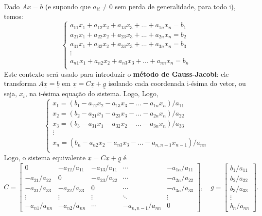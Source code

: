 \documentclass[../numerical_methods.tex]{subfiles}
\begin{document}
Dado \(Ax = b\) (e supondo que \(a_{ii}\neq 0\) sem perda de generalidade, para todo i), temos:
\[
	\left\{\begin{array}{ll}
		a_{11}x_1 + a_{12}x_2 + a_{13}x_3 + \dotsc + a_{1n}x_{n} = b_1 \\
		a_{21}x_1 + a_{22}x_2 + a_{23}x_3 + \dotsc + a_{2n}x_{n} = b_2 \\
		a_{31}x_1 + a_{32}x_2 + a_{33}x_3 + \dotsc + a_{3n}x_{n} = b_3 \\
		\vdots                                                         \\
		a_{n1}x_1 + a_{n2}x_2 + a_{n3}x_3 + \dotsc + a_{nn}x_{n} = b_n \\
	\end{array}\right.
\]
Este contexto será usado para introduzir o \textbf{método de Gauss-Jacobi}: ele transforma \(A\underline{x} = \underline{b}\) em \(\underline{x} = C\underline{x} + \underline{g}\) isolando cada coordenada i-ésima do vetor, ou seja, \(x_{i}\), na i-ésima equação do sistema. Logo,
Logo,
\[
	\left\{\begin{array}{ll}
		x_1 = (b_1-a_{12}x_2 - a_{13}x_3 -\dotsc - a_{1n}x_{n})/a_{11}       \\
		x_2 = (b_2-a_{21}x_1 - a_{23}x_3 -\dotsc - a_{2n}x_{n})/a_{22}       \\
		x_3 = (b_3-a_{31}x_1 - a_{32}x_2 -\dotsc - a_{3n}x_{n})/a_{33}       \\
		\vdots                                                               \\
		x_n = (b_n-a_{n2}x_2 - a_{n3}x_3 -\dotsc - a_{n, n-1}x_{n-1})/a_{nn} \\
	\end{array}\right.
\]
Logo, o sistema equivalente \(\underline{x} = C\underline{x} + \underline{g}\) é
\[
	C = \begin{bmatrix}
		0              & -a_{12}/a_{11} & -a_{13}/a_{11} & \cdots            & -a_{1n}/a_{11} \\
		-a_{21}/a_{22} & 0              & -a_{23}/a_{22} & \cdots            & -a_{2n}/a_{22} \\
		-a_{31}/a_{33} & -a_{32}/a_{33} & 0              & \cdots            & -a_{3n}/a_{33} \\
		\vdots         & \vdots         & \vdots         & \ddots            & \vdots         \\
		-a_{n1}/a_{nn} & -a_{n2}/a_{nn} & \cdots         & -a_{n,n-1}/a_{nn} & 0
	\end{bmatrix},\quad g=\begin{bmatrix}
		b_1/a_{11} \\
		b_2/a_{22} \\
		b_3/a_{33} \\
		\vdots     \\
		b_n/a_{nn}
	\end{bmatrix}.
\]
\end{document}
